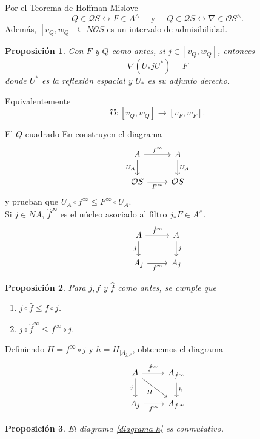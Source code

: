 \documentclass[compress,12pt]{beamer}
\newtheorem{prop}{Proposición}
\begin{document}
\begin{frame}
Por el Teorema de Hoffman-Mislove 
\[
Q\in \mathcal{Q}S\leftrightarrow F\in A^\wedge\quad \mbox{ y } \quad Q\in \mathcal{Q}S\leftrightarrow \nabla\in \mathcal{O}S^\wedge.
\]
Además, $[v_Q, w_Q]\subseteq N\mathcal{O}S$ es un intervalo de admisibilidad.

\begin{prop}
Con $F$ y $Q$ como antes, si $j\in [v_Q, w_Q]$, entonces 
\[
\nabla(U_*jU^*)=F
\]
donde $U^*$ es la reflexión espacial y $U_*$ es su adjunto derecho.
\end{prop}
Equivalentemente
\[
\mho\colon [v_Q, w_Q]\to [v_F, w_F].
\]
\end{frame}

\begin{frame}[fragile]{El $Q$-cuadrado}
En \cite{H.S.V} construyen el diagrama
\[\begin{tikzcd}
	A & A \\
	{\mathcal{O}S} & {\mathcal{O}S}
	\arrow["{f^\infty}", from=1-1, to=1-2]
	\arrow["{U_A}"', from=1-1, to=2-1]
	\arrow["{U_A}", from=1-2, to=2-2]
	\arrow["{F^\infty}"', from=2-1, to=2-2]
\end{tikzcd}\]
y prueban que $U_A\circ f^\infty\leq F^\infty \circ U_A$.\\
	
Si $j\in NA$, $\hat{f}^\infty$ es el núcleo asociado al filtro $j_*F\in A^\wedge$.
\[\begin{tikzcd}
	A & A \\
	{A_j} & {A_j}
	\arrow["{\hat{f}^\infty}", from=1-1, to=1-2]
	\arrow["{j}"', from=1-1, to=2-1]
	\arrow["{j}", from=1-2, to=2-2]
	\arrow["{f^\infty}"', from=2-1, to=2-2]
\end{tikzcd}\]
\end{frame}

\begin{frame}[fragile]
\begin{prop}
Para $j, f$ y $\hat{f}$ como antes, se cumple que
\begin{enumerate}
\item $j\circ \hat{f}\leq f\circ j$.
\item $j\circ \hat{f}^\infty \leq f^\infty\circ j$.
\end{enumerate}
\end{prop}

Definiendo $H=f^\infty\circ j$ y $h=H_{\mid A_{j_*F}}$, obtenemos el diagrama
\begin{equation}\label{diagrama h}
	\begin{tikzcd}
	A & {A_{\hat{f}^\infty}} \\
	{A_j} & {A_{f^\infty}}
	\arrow["{\hat{f}^\infty}", from=1-1, to=1-2]
	\arrow["j"', from=1-1, to=2-1]
	\arrow["H"', from=1-1, to=2-2]
	\arrow["h", from=1-2, to=2-2]
	\arrow["{f^\infty}"', from=2-1, to=2-2]
\end{tikzcd}
\end{equation}

\begin{prop}
	El diagrama \eqref{diagrama h} es conmutativo.
\end{prop}
\end{frame}
\end{document}
